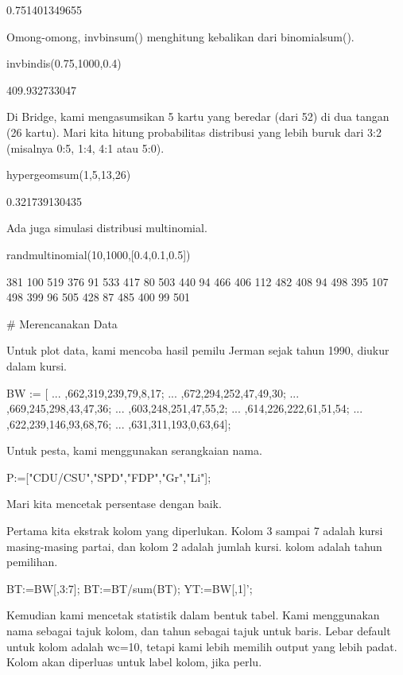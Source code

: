 \documentclass{article}
\begin{document}
    0.751401349655

Omong-omong, invbinsum() menghitung kebalikan dari binomialsum().


\>invbindis(0.75,1000,0.4)


    409.932733047

Di Bridge, kami mengasumsikan 5 kartu yang beredar (dari 52) di dua
tangan (26 kartu). Mari kita hitung probabilitas distribusi yang lebih
buruk dari 3:2 (misalnya 0:5, 1:4, 4:1 atau 5:0).


\*hypergeomsum(1,5,13,26)


    0.321739130435

Ada juga simulasi distribusi multinomial.


\>randmultinomial(10,1000,[0.4,0.1,0.5])


              381           100           519 
              376            91           533 
              417            80           503 
              440            94           466 
              406           112           482 
              408            94           498 
              395           107           498 
              399            96           505 
              428            87           485 
              400            99           501 

# Merencanakan Data

Untuk plot data, kami mencoba hasil pemilu Jerman sejak tahun 1990,
diukur dalam kursi.


\>BW := [ ...  
,662,319,239,79,8,17; ...  
,672,294,252,47,49,30; ...  
,669,245,298,43,47,36; ...  
,603,248,251,47,55,2; ...  
,614,226,222,61,51,54; ...  
,622,239,146,93,68,76; ...  
,631,311,193,0,63,64];


Untuk pesta, kami menggunakan serangkaian nama.


\>P:=["CDU/CSU","SPD","FDP","Gr","Li"];


Mari kita mencetak persentase dengan baik.


Pertama kita ekstrak kolom yang diperlukan. Kolom 3 sampai 7 adalah
kursi masing-masing partai, dan kolom 2 adalah jumlah kursi. kolom
adalah tahun pemilihan.


\>BT:=BW[,3:7]; BT:=BT/sum(BT); YT:=BW[,1]';


Kemudian kami mencetak statistik dalam bentuk tabel. Kami menggunakan
nama sebagai tajuk kolom, dan tahun sebagai tajuk untuk baris. Lebar
default untuk kolom adalah wc=10, tetapi kami lebih memilih output
yang lebih padat. Kolom akan diperluas untuk label kolom, jika perlu.
\end{document}
